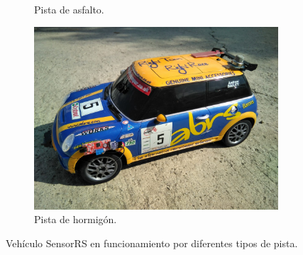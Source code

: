 \begin{description}
\begin{figure}[H]
\begin{subfigure}[b]{0.4\textwidth}
        \caption{Pista de asfalto.}
        \label{fig:tiger}
    \end{subfigure}
    \begin{subfigure}[b]{0.4\textwidth}
        \includegraphics[width=\textwidth]{imagenes/robot/hormigon.jpg}
        \caption{Pista de hormigón.}
        \label{fig:mouse}
    \end{subfigure}
    \caption{Vehículo SensorRS en funcionamiento por diferentes tipos de pista.}\label{fig:animals}
\end{figure}

\end{description}



